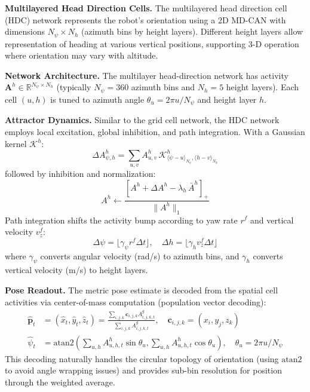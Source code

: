 \textbf{Multilayered Head Direction Cells.} The multilayered head direction cell (HDC) network represents the robot's orientation using a 2D MD-CAN with dimensions $N_\psi \times N_h$ (azimuth bins by height layers). Different height layers allow representation of heading at various vertical positions, supporting 3-D operation where orientation may vary with altitude.

\textbf{Network Architecture.} The multilayer head-direction network has activity $\mathbf{A}^{h} \in \mathbb{R}^{N_\psi \times N_h}$ (typically $N_\psi = 360$ azimuth bins and $N_h = 5$ height layers). Each cell $(u, h)$ is tuned to azimuth angle $\theta_u = 2\pi u / N_\psi$ and height layer $h$.

\textbf{Attractor Dynamics.} Similar to the grid cell network, the HDC network employs local excitation, global inhibition, and path integration. With a Gaussian kernel $\mathcal{K}^{h}$:
\begin{equation}
    \Delta A^{h}_{\psi,h}=\sum_{u,v}A^{h}_{u,v}\,\mathcal{K}^{h}_{\langle \psi-u\rangle_{N_\psi},\langle h-v\rangle_{N_h}}
\end{equation}
followed by inhibition and normalization:
\begin{equation}
    A^{h}\leftarrow \frac{[A^{h}+\Delta A^{h}-\lambda_h\,\bar A^{h}]_+}{\lVert A^{h}\rVert_1}
\end{equation}
Path integration shifts the activity bump according to yaw rate $r^f$ and vertical velocity $v^f_z$:
\begin{equation}
    \Delta\psi=\lfloor \gamma_\psi r^f \Delta t\rfloor,\quad \Delta h=\lfloor \gamma_h v^f_z \Delta t\rfloor
\end{equation}
where $\gamma_\psi$ converts angular velocity (rad/s) to azimuth bins, and $\gamma_h$ converts vertical velocity (m/s) to height layers.

\textbf{Pose Readout.} The metric pose estimate is decoded from the spatial cell activities via center-of-mass computation (population vector decoding):
\begin{align}
    \hat{\mathbf{p}}_t & = ({\hat x}_t, {\hat y}_t, {\hat z}_t) = \frac{\sum_{i,j,k} \mathbf{c}_{i,j,k} A^{g}_{i,j,k,t}}{\sum_{i,j,k} A^{g}_{i,j,k,t}}, \quad \mathbf{c}_{i,j,k} = (x_i, y_j, z_k) \\
    \hat{\psi}_t       & = \mathrm{atan2}\left(\sum_{u,h} A^{h}_{u,h,t} \sin\theta_u, \sum_{u,h} A^{h}_{u,h,t} \cos\theta_u\right), \quad \theta_u = 2\pi u / N_\psi
\end{align}
This decoding naturally handles the circular topology of orientation (using $\mathrm{atan2}$ to avoid angle wrapping issues) and provides sub-bin resolution for position through the weighted average.

